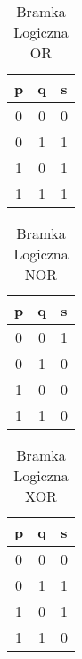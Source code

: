 \documentclass[12pt, letterpaper, titlepage]{article}
\begin{document}
\begin{table}[h]
\centering\caption{Bramka Logiczna OR}
\begin{tabular}{c|c|c}

p & q & s\\
\hline
\hline
0 & 0 & 0\\
\hline
0 & 1 & 1\\
\hline
1 & 0 & 1\\
\hline
1 & 1 & 1\\

\end{tabular}
\end{table}

\begin{table}[h]
\centering\caption{Bramka Logiczna NOR}
\begin{tabular}{c|c|c}

p & q & s\\
\hline
\hline
0 & 0 & 1\\
\hline
0 & 1 & 0\\
\hline
1 & 0 & 0\\
\hline
1 & 1 & 0\\

\end{tabular}
\end{table}

\begin{table}[h]
\centering\caption{Bramka Logiczna XOR}
\begin{tabular}{c|c|c}

p & q & s\\
\hline
\hline
0 & 0 & 0\\
\hline
0 & 1 & 1\\
\hline
1 & 0 & 1\\
\hline
1 & 1 & 0\\

\end{tabular}
\end{table}
\end{document}
